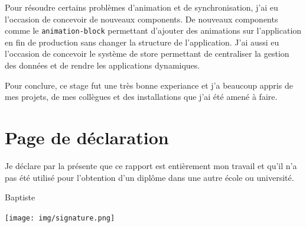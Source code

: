 \documentclass{article}
\begin{document}
    Pour résoudre certains problèmes d'animation et de synchronisation, j'ai eu l'occasion de concevoir de nouveaux components.
    De nouveaux components comme le \texttt{animation-block} permettant d'ajouter des animations sur l'application en fin de production sans changer la structure de l'application.
    J'ai aussi eu l'occasion de concevoir le système de store permettant de centraliser la gestion des données et de rendre les applications dynamiques.

    Pour conclure, ce stage fut une très bonne experiance et j'a beaucoup appris de mes projets, de mes collègues et des installations que j'ai été amené à faire.

    \clearpage

    \section{Page de déclaration}

    \vspace{\fill}

    Je déclare par la présente que ce rapport est entièrement mon travail et qu'il n'a pas été utilisé pour l'obtention d'un diplôme dans une autre école ou université.

    \vspace{3cm}

    \hspace{\fill}Baptiste 

    \hspace{\fill}\texttt{[image: img/signature.png]}

    \vspace{\fill}
\end{document}
